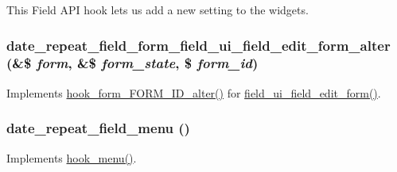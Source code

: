 This Field API hook lets us add a new setting to the widgets. \hypertarget{date__repeat__field_8module_ac32396f6f544c90c240d4bd40e908124}{
\subsubsection[{date\_\-repeat\_\-field\_\-form\_\-field\_\-ui\_\-field\_\-edit\_\-form\_\-alter}]{\setlength{\rightskip}{0pt plus 5cm}date\_\-repeat\_\-field\_\-form\_\-field\_\-ui\_\-field\_\-edit\_\-form\_\-alter (\&\$ {\em form}, \/  \&\$ {\em form\_\-state}, \/  \$ {\em form\_\-id})}}
\label{date__repeat__field_8module_ac32396f6f544c90c240d4bd40e908124}
Implements \hyperlink{group__hooks_ga8d4a4089551493d55911bd5c4f218264}{hook\_\-form\_\-FORM\_\-ID\_\-alter()} for \hyperlink{group__forms_ga11660e91b3649ff30bf665c00f1a9af2}{field\_\-ui\_\-field\_\-edit\_\-form()}. \hypertarget{date__repeat__field_8module_a0b5b94e740d6fdd96411f1c230a1d465}{
\subsubsection[{date\_\-repeat\_\-field\_\-menu}]{\setlength{\rightskip}{0pt plus 5cm}date\_\-repeat\_\-field\_\-menu ()}}
\label{date__repeat__field_8module_a0b5b94e740d6fdd96411f1c230a1d465}
Implements \hyperlink{group__hooks_ga5c95244fea59b25666e409759e133ded}{hook\_\-menu()}.

